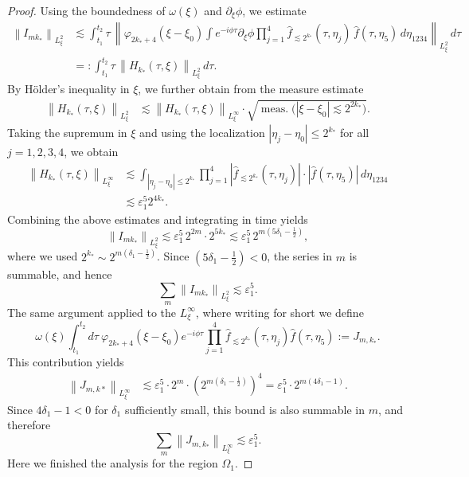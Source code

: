 \documentclass[reqno,english,11pt]{amsart}
\newcommand{\eps}{\varepsilon}
\newcommand{\snorm}[1]{\left\|#1\right\|}
\theoremstyle{definition}
\numberwithin{equation}{section}
\begin{document}
\begin{proof}
Using the boundedness of $\omega(\xi)$ and $\partial_\xi \phi$, we estimate
\begin{align*}
\snorm{I_{m k_{*}}}_{L^2_\xi}
&\lesssim \int_{t_1}^{t_2} \tau\, \snorm{\varphi_{2k_{*}+4}(\xi-\xi_0) \int e^{-i\phi\tau}\partial_\xi\phi \prod_{j=1}^4 \widehat f_{\lesssim 2^{k_{*}}}(\tau,\eta_j) \,\widehat f(\tau,\eta_5)\,d\eta_{1234}}_{L^2_\xi} \, d\tau \\
&=: \int_{t_1}^{t_2} \tau\, \snorm{H_{k_*}(\tau,\xi)}_{L^2_\xi}\, d\tau.
\end{align*}
By Hölder’s inequality in $\xi$, we further obtain from the measure estimate
\begin{align*}
\snorm{H_{k_*}(\tau,\xi)}_{L^2_\xi}
&\lesssim \snorm{H_{k_*}(\tau,\xi)}_{L^\infty_\xi}
\cdot \sqrt{\operatorname{meas.}\big(|\xi-\xi_0|\lesssim 2^{2k_{*}}\big)}.
\end{align*}
Taking the supremum in $\xi$ and using the localization $|\eta_j-\eta_0|\leq 2^{k_*}$ for all $j=1,2,3,4$, we obtain
\begin{align*}
\snorm{H_{k_{*}}(\tau,\xi)}_{L^\infty_\xi}
&\lesssim \int_{|\eta_j-\eta_0|\le 2^{k_{*}}}
\prod_{j=1}^4 \left|\widehat f_{\lesssim 2^{k_{*}}}(\tau,\eta_j)\right|\cdot \left|\widehat f(\tau,\eta_5)\right|
\, d\eta_{1234} \\
&\lesssim \eps_1^5 2^{4k_{*}}.
\end{align*}
Combining the above estimates and integrating in time yields 
$$ \snorm{I_{m k_{*}}}_{L^2_\xi} \lesssim \eps_1^5\,2^{2m}\cdot 2^{5k_{*}} \lesssim \eps_1^5\, 2^{m(5\delta_1-\frac{1}{2})},$$
where we used $2^{k_{*}}\sim 2^{m(\delta_1-\frac12)}$. Since $(5\delta_1-\frac{1}{2})<0$, the series in $m$ is summable, and hence
$$ \sum_m \snorm{I_{mk_{*}}}_{L^2_\xi} \lesssim \varepsilon_1^5.$$
The same argument applied to the $L^{\infty}_{\xi}$, where writing for short we define
\begin{equation*}
    \omega(\xi)\int_{t_1}^{t_2}d\tau \ \varphi_{2k_{*}+4}\left(\xi-\xi_0\right)e^{-i\phi \tau}  \prod^4_{j=1} \widehat{f}_{\lesssim 2^{k_{*}}} \left(\tau,\eta_{j}\right)  
    \widehat{f}\left(\tau,\eta_{5}\right):=J_{m,k_*}.
\end{equation*}
This contribution yields
\begin{align*} 
\snorm{J_{m, k*}}_{L^\infty_\xi} &\lesssim \eps_1^5 \cdot 2^m \cdot \left(2^{m(\delta_1 - \frac{1}{2})}\right)^4= \eps_1^5 \cdot 2^{m(4\delta_1 - 1)} .
\end{align*}
Since $4\delta_1-1<0$ for $\delta_1$ sufficiently small,
this bound is also summable in $m$, and therefore
$$
\sum_{m}\snorm{J_{m,k_{*}}}_{L^{\infty}_{\xi}} \lesssim \eps_1^5.
$$
Here we finished the analysis for the region $\Omega_1$.
\end{proof}
\end{document}
